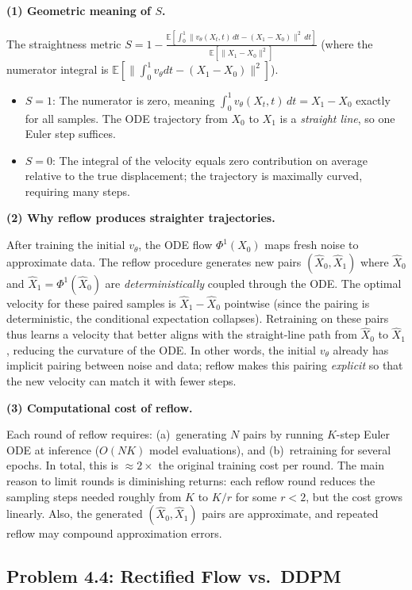 \documentclass[11pt]{article}
\newcommand{\E}{\mathbb{E}}
\begin{document}
\textbf{(1) Geometric meaning of $S$.}

The straightness metric $S = 1 - \frac{\E[\int_0^1\|v_\theta(X_t,t)\,dt-(X_1-X_0)\|^2\,dt]}{\E[\|X_1-X_0\|^2]}$
(where the numerator integral is $\E[\|\int_0^1 v_\theta dt - (X_1-X_0)\|^2]$).

\begin{itemize}
\item $S=1$: The numerator is zero, meaning $\int_0^1 v_\theta(X_t,t)\,dt = X_1-X_0$ exactly for all samples.  The ODE trajectory from $X_0$ to $X_1$ is a \emph{straight line}, so one Euler step suffices.
\item $S=0$: The integral of the velocity equals zero contribution on average relative to the true displacement; the trajectory is maximally curved, requiring many steps.
\end{itemize}

\textbf{(2) Why reflow produces straighter trajectories.}

After training the initial $v_\theta$, the ODE flow $\Phi^1(X_0)$ maps fresh noise to approximate data. The reflow procedure generates new pairs $(\hat X_0, \hat X_1)$ where $\hat X_0$ and $\hat X_1=\Phi^1(\hat X_0)$ are \emph{deterministically} coupled through the ODE.  The optimal velocity for these paired samples is $\hat X_1-\hat X_0$ pointwise (since the pairing is deterministic, the conditional expectation collapses).  Retraining on these pairs thus learns a velocity that better aligns with the straight-line path from $\hat X_0$ to $\hat X_1$, reducing the curvature of the ODE.  In other words, the initial $v_\theta$ already has implicit pairing between noise and data; reflow makes this pairing \emph{explicit} so that the new velocity can match it with fewer steps.

\textbf{(3) Computational cost of reflow.}

Each round of reflow requires: (a)~generating $N$ pairs by running $K$-step Euler ODE at inference ($O(NK)$ model evaluations), and (b)~retraining for several epochs.  In total, this is $\approx 2\times$ the original training cost per round.  The main reason to limit rounds is diminishing returns: each reflow round reduces the sampling steps needed roughly from $K$ to $K/r$ for some $r<2$, but the cost grows linearly.  Also, the generated $(\hat X_0,\hat X_1)$ pairs are approximate, and repeated reflow may compound approximation errors.

\subsection{Problem 4.4: Rectified Flow vs.\ DDPM}
\end{document}
